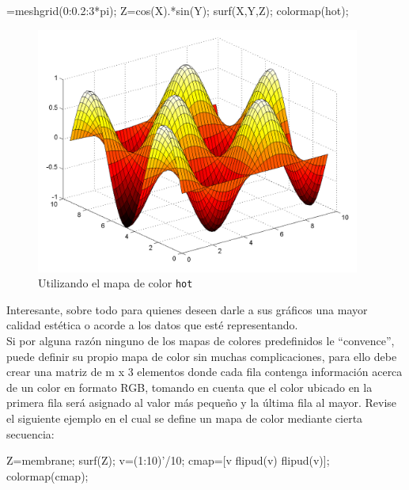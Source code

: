 \begin{matlab}
[X,Y]=meshgrid(0:0.2:3*pi);
Z=cos(X).*sin(Y);
surf(X,Y,Z);
colormap(hot);
\end{matlab}

\begin{figure}[htbp]
    \centering
    \includegraphics[width=0.95\textwidth]{images/ch4/img_4_10.png}
    \caption{Utilizando el mapa de color \texttt{hot}}
    \label{fig:label}
\end{figure}

Interesante, sobre todo para quienes deseen darle a sus gráficos una
mayor calidad estética o acorde a los datos que esté representando. \\

Si por alguna razón ninguno de los mapas de colores predefinidos le
``convence'', puede definir su propio mapa de color sin muchas
complicaciones, para ello debe crear una matriz de m x 3 elementos donde
cada fila contenga información acerca de un color en formato RGB,
tomando en cuenta que el color ubicado en la primera fila será asignado
al valor más pequeño y la última fila al mayor. Revise el siguiente
ejemplo en el cual se define un mapa de color mediante cierta secuencia:

\begin{matlab}
Z=membrane;
surf(Z);
v=(1:10)'/10;
cmap=[v flipud(v) flipud(v)];
colormap(cmap);
\end{matlab}

